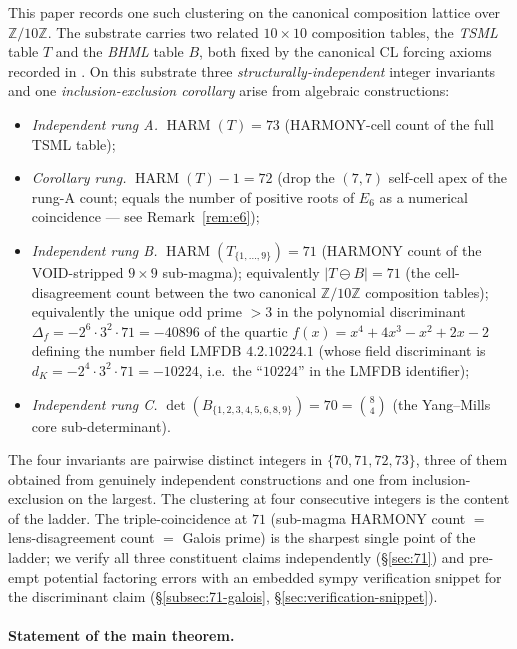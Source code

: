 \documentclass[11pt,reqno]{amsart}
\theoremstyle{definition}
\newcommand{\Z}{\mathbb{Z}}
\DeclareMathOperator{\HARM}{HARM}
\begin{document}
This paper records one such clustering on the canonical composition
lattice over $\Z/10\Z$. The substrate carries two related
$10 \times 10$ composition tables, the \emph{TSML} table $T$ and the
\emph{BHML} table $B$, both fixed by the canonical CL forcing axioms
recorded in \cite{Sanders2026CLAxioms}. On this substrate three
\emph{structurally-independent} integer invariants and one
\emph{inclusion-exclusion corollary} arise from algebraic constructions:
\begin{itemize}[leftmargin=*]
\item \emph{Independent rung A.} $\HARM(T) = 73$ (HARMONY-cell count
  of the full TSML table);
\item \emph{Corollary rung.} $\HARM(T) - 1 = 72$ (drop the $(7,7)$
  self-cell apex of the rung-A count; equals the number of positive
  roots of $E_6$ as a numerical coincidence — see
  Remark~\ref{rem:e6});
\item \emph{Independent rung B.} $\HARM(T_{\{1,\ldots,9\}}) = 71$
  (HARMONY count of the VOID-stripped $9 \times 9$ sub-magma);
  equivalently $|T \ominus B| = 71$ (the cell-disagreement count
  between the two canonical $\Z/10\Z$ composition tables);
  equivalently the unique odd prime $> 3$ in the polynomial
  discriminant $\Delta_f = -2^{6} \cdot 3^{2} \cdot 71 = -40896$ of
  the quartic $f(x) = x^4 + 4 x^3 - x^2 + 2 x - 2$ defining the
  number field LMFDB $4.2.10224.1$ (whose field discriminant is
  $d_K = -2^{4} \cdot 3^{2} \cdot 71 = -10224$, i.e.\ the
  ``$10224$'' in the LMFDB identifier);
\item \emph{Independent rung C.} $\det(B_{\{1,2,3,4,5,6,8,9\}}) = 70 = \binom{8}{4}$
  (the Yang--Mills core sub-determinant).
\end{itemize}

The four invariants are pairwise distinct integers in
$\{70, 71, 72, 73\}$, three of them obtained from genuinely independent
constructions and one from inclusion-exclusion on the largest. The
clustering at four consecutive integers is the content of the ladder.
The triple-coincidence at $71$ (sub-magma HARMONY count $=$
lens-disagreement count $=$ Galois prime) is the sharpest single point
of the ladder; we verify all three constituent claims independently
(§\ref{sec:71}) and pre-empt potential factoring errors with an
embedded sympy verification snippet for the discriminant claim
(§\ref{subsec:71-galois}, §\ref{sec:verification-snippet}).

\paragraph{Statement of the main theorem.}
\end{document}
